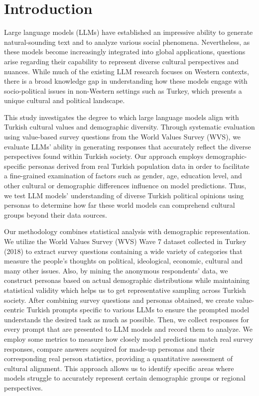 \section{Introduction}
\label{sec:introduction}

Large language models (LLMs) have established an impressive ability to generate natural-sounding text and to analyze various social phenomena.
Nevertheless, as these models become increasingly integrated into global applications, questions arise regarding their capability to represent diverse cultural perspectives and nuances. 
While much of the existing LLM research focuses on Western contexts, there is a broad knowledge gap in understanding how these models engage with socio-political issues in non-Western settings such as Turkey, which presents a unique cultural and political landscape.

This study investigates the degree to which large language models align with Turkish cultural values and demographic diversity. 
Through systematic evaluation using value-based survey questions from the World Values Survey (WVS), we evaluate LLMs' ability in generating responses that accurately reflect the diverse perspectives found within Turkish society.
Our approach employs demographic-specific personas derived from real Turkish population data in order to facilitate a fine-grained examination of factors such as gender, age, education level, and other cultural or demographic differences influence on model predictions. 
Thus, we test LLM models' understanding of diverse Turkish political opinions using personas to determine how far these world models can comprehend cultural groups beyond their data sources.

Our methodology combines statistical analysis with demographic representation.
We utilize the World Values Survey (WVS) Wave 7 dataset collected in Turkey (2018) to extract survey questions containing a wide variety of categories that measure the people's thoughts on political, ideological, economic, cultural and many other issues. 
Also, by mining the anonymous respondents' data, we construct personas based on actual demographic distributions while maintaining statistical validity which helps us to get representative sampling across Turkish society. 
After combining survey questions and personas obtained, we create value-centric Turkish prompts specific to various LLMs to ensure the prompted model understands the desired task as much as possible. 
Then, we collect responses for every prompt that are presented to LLM models and record them to analyze. 
We employ some metrics to measure how closely model predictions match real survey responses, compare answers acquired for made-up personas and their corresponding real person statistics, providing a quantitative assessment of cultural alignment. 
This approach allows us to identify specific areas where models struggle to accurately represent certain demographic groups or regional perspectives.

